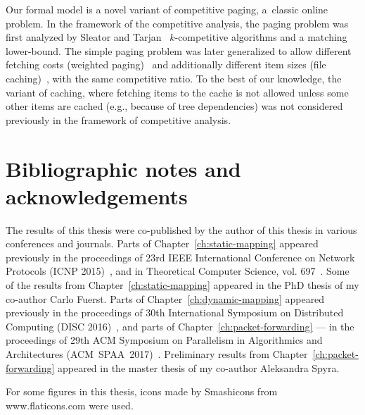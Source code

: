 Our formal model is a novel variant of competitive paging, a~classic online
problem. In the framework of the competitive analysis, the paging problem was
first analyzed  by Sleator and Tarjan~\cite{competitive-analysis} $k$-competitive algorithms and a matching lower-bound.
The simple paging problem was later generalized to allow different fetching
costs (weighted paging)~\cite{double-coverage,young-paging-greedy-dual} and
additionally different item sizes (file caching)~\cite{young-paging-landlord},
with the same competitive ratio.
To the best of our knowledge, the variant of caching, where fetching items to
the cache is not allowed unless some other items are cached (e.g., because of 
tree dependencies) was 
not considered previously in the framework of competitive analysis.



\section{Bibliographic notes and acknowledgements}

The results of this thesis were co-published by the author of this thesis in various conferences and journals.
Parts of Chapter~\ref{ch:static-mapping} appeared previously in the proceedings of 23rd IEEE International Conference on Network Protocols (ICNP 2015)~\cite{my-icnp},
and in Theoretical Computer Science, vol. 697~\cite{my-tcs}.
Some of the results from Chapter~\ref{ch:static-mapping} appeared in the PhD thesis of my co-author Carlo Fuerst.
Parts of Chapter~\ref{ch:dynamic-mapping} appeared previously in the proceedings of 30th International Symposium on Distributed Computing (DISC 2016)~\cite{my-disc}, and parts of Chapter~\ref{ch:packet-forwarding} --- in the proceedings of 29th ACM Symposium on Parallelism in Algorithmics and Architectures (ACM~SPAA~2017)~\cite{my-spaa}.
Preliminary results from Chapter~\ref{ch:packet-forwarding} appeared in the master thesis of my co-author Aleksandra Spyra.

For some figures in this thesis, icons made by Smashicons from www.flaticons.com were used.